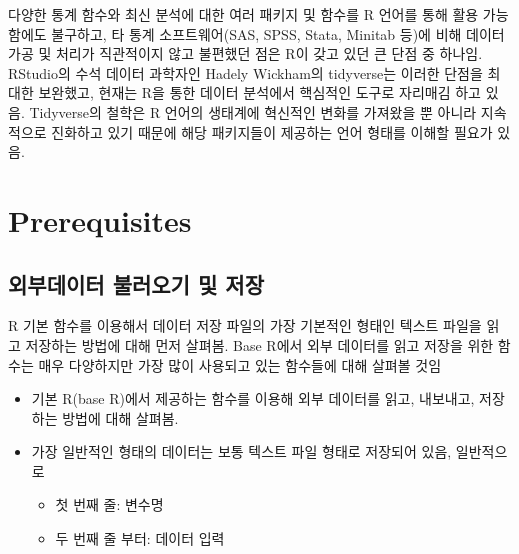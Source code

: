 \documentclass[
  11pt,
]{krantz}
\makeatletter
\providecommand{\tightlist}{%
  \setlength{\itemsep}{0pt}\setlength{\parskip}{0pt}}
\newenvironment{kframe}{%
\medskip{}
\setlength{\fboxsep}{.8em}
 \def\at@end@of@kframe{}%
 \ifinner\ifhmode%
  \def\at@end@of@kframe{\end{minipage}}%
  \begin{minipage}{\columnwidth}%
 \fi\fi%
 \def\FrameCommand##1{\hskip\@totalleftmargin \hskip-\fboxsep
 \colorbox{shadecolor}{##1}\hskip-\fboxsep
     \hskip-\linewidth \hskip-\@totalleftmargin \hskip\columnwidth}%
 \MakeFramed {\advance\hsize-\width
   \@totalleftmargin\z@ \linewidth\hsize
   \@setminipage}}%
 {\par\unskip\endMakeFramed%
 \at@end@of@kframe}
\newenvironment{rmdblock}[1]
  {
  \begin{itemize}
  \renewcommand{\labelitemi}{
    \raisebox{-.7\height}[0pt][0pt]{
      {\setkeys{Gin}{width=3em,keepaspectratio}\texttt{[image: images/\#1]}}
    }
  }
  \setlength{\fboxsep}{1em}
  \begin{kframe}
  \item
  }
  {
  \end{kframe}
  \end{itemize}
  }
\newenvironment{rmdnote}
  {\begin{rmdblock}{note}}
  {\end{rmdblock}}
\makeatother
\begin{document}
다양한 통계 함수와 최신 분석에 대한 여러 패키지 및 함수를 R 언어를 통해 활용 가능함에도 불구하고, 타 통계 소프트웨어(SAS, SPSS, Stata, Minitab 등)에 비해 데이터 가공 및 처리가 직관적이지 않고 불편했던 점은 R이 갖고 있던 큰 단점 중 하나임. RStudio의 수석 데이터 과학자인 Hadely Wickham의 tidyverse는 이러한 단점을 최대한 보완했고, 현재는 R을 통한 데이터 분석에서 핵심적인 도구로 자리매김 하고 있음. Tidyverse의 철학은 R 언어의 생태계에 혁신적인 변화를 가져왔을 뿐 아니라 지속적으로 진화하고 있기 때문에 해당 패키지들이 제공하는 언어 형태를 이해할 필요가 있음.

\hypertarget{ch4-prerequi}{%
\section{Prerequisites}\label{ch4-prerequi}}

\hypertarget{data-import-export}{%
\subsection{외부데이터 불러오기 및 저장}\label{data-import-export}}

\footnotesize

\begin{rmdnote}
\begin{rmdnote}

R 기본 함수를 이용해서 데이터 저장 파일의 가장 기본적인 형태인 텍스트 파일을 읽고 저장하는 방법에 대해 먼저 살펴봄. Base R에서 외부 데이터를 읽고 저장을 위한 함수는 매우 다양하지만 가장 많이 사용되고 있는 함수들에 대해 살펴볼 것임

\end{rmdnote}
\end{rmdnote}

\normalsize

\begin{itemize}
\tightlist
\item
  기본 R(base R)에서 제공하는 함수를 이용해 외부 데이터를 읽고, 내보내고, 저장하는 방법에 대해 살펴봄.
\item
  가장 일반적인 형태의 데이터는 보통 텍스트 파일 형태로 저장되어 있음, 일반적으로

  \begin{itemize}
  \tightlist
  \item
    첫 번째 줄: 변수명
  \item
    두 번째 줄 부터: 데이터 입력
  \end{itemize}
\end{itemize}
\end{document}
